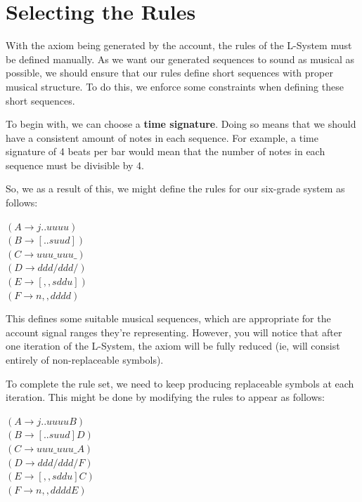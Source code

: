 \section{Selecting the Rules}

With the axiom being generated by the account, the rules of the L-System must be defined manually. As we want our generated sequences to sound as musical as possible, we should ensure that our rules define short sequences with proper musical structure. To do this, we enforce some constraints when defining these short sequences.

To begin with, we can choose a \textbf{time signature}. Doing so means that we should have a consistent amount of notes in each sequence. For example, a time signature of 4 beats per bar would mean that the number of notes in each sequence must be divisible by 4.

So, we as a result of this, we might define the rules for our six-grade system as follows:

\begin{singlespace}
\begin{formality}
$( A \rightarrow j..uuuu )$\\
$( B \rightarrow [..suud] )$\\
$( C \rightarrow uuu\_uuu\_ )$\\
$( D \rightarrow ddd/ddd/ )$\\
$( E \rightarrow [,,sddu] )$\\
$( F \rightarrow n,,dddd )$
\end{formality}
\end{singlespace}

This defines some suitable musical sequences, which are appropriate for the account signal ranges they're representing. However, you will notice that after one iteration of the L-System, the axiom will be fully reduced (ie, will consist entirely of non-replaceable symbols).

To complete the rule set, we need to keep producing replaceable symbols at each iteration.  This might be done by modifying the rules to appear as follows:

\begin{singlespace}
\begin{formality}
$( A \rightarrow j..uuuuB )$\\
$( B \rightarrow [..suud]D )$\\
$( C \rightarrow uuu\_uuu\_A )$\\
$( D \rightarrow ddd/ddd/F )$\\
$( E \rightarrow [,,sddu]C )$\\
$( F \rightarrow n,,ddddE )$
\end{formality}
\end{singlespace}

